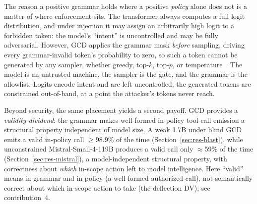 The reason a positive grammar holds where a positive \emph{policy} alone does not is a matter of where enforcement sits. The transformer always computes a full logit distribution, and under injection it may assign an arbitrarily high logit to a forbidden token: the model's ``intent'' is uncontrolled and may be fully adversarial. However, GCD applies the grammar mask \emph{before} sampling, driving every grammar-invalid token's probability to zero, so such a token cannot be generated by any sampler, whether greedy, top-\(k\), top-\(p\), or temperature~\cite{willard2023, dong2024xgrammar}. The model is an untrusted machine, the sampler is the gate, and the grammar is the allowlist. Logits encode intent and are left uncontrolled; the generated tokens are constrained out-of-band, at a point the attacker's tokens never reach.

Beyond security, the same placement yields a second payoff. GCD provides a \emph{validity dividend}: the grammar makes well-formed in-policy tool-call emission a structural property independent of model size. A weak 1.7B under blind GCD emits a valid in-policy call \(\geq\)98.9\% of the time (Section~\ref{sec:res-blast}), while unconstrained Mistral-Small-4-119B produces a valid call only \(\approx\)59\% of the time (Section~\ref{sec:res-mistral}), a model-independent structural property, with correctness about \emph{which} in-scope action left to model intelligence. Here ``valid'' means in-grammar and in-policy (a well-formed authorized call), not semantically correct about which in-scope action to take (the deflection DV); see contribution~4.

